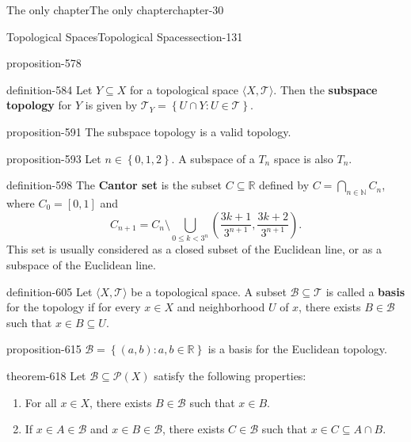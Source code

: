 \documentclass[oneside,10pt,]{book}
\newcommand{\terminology}[1]{\textbf{#1}}
\newcommand{\tuple}[1]{\langle #1 \rangle}
\newcommand{\mb}{\mathbb}
\newcommand{\mc}{\mathcal}
\newcommand{\setBuilder}[2]{\left\{#1:#2\right\}}
\newcommand{\setList}[1]{\left\{#1\right\}}
\newcommand{\lt}{<}
\begin{document}
\begin{chapterptx}{The only chapter}{}{The only chapter}{}{}{chapter-30}
\begin{sectionptx}{Topological Spaces}{}{Topological Spaces}{}{}{section-131}
\begin{proposition}{}{}{proposition-578}
\end{proposition}
\begin{definition}{}{definition-584}%
\hypertarget{p-585}{}%
Let \(Y\subseteq X\) for a topological space \(\tuple{X,\mc T}\). Then the \terminology{subspace topology} for \(Y\) is given by \(\mc T_Y=\setBuilder{U\cap Y}{U\in\mc T}\).%
\end{definition}
\begin{proposition}{}{}{proposition-591}%
\hypertarget{p-592}{}%
The subspace topology is a valid topology.%
\end{proposition}
\begin{proposition}{}{}{proposition-593}%
\hypertarget{p-594}{}%
Let \(n\in\setList{0,1,2}\). A subspace of a \(T_n\) space is also \(T_n\).%
\end{proposition}
\begin{definition}{}{definition-598}%
\hypertarget{p-599}{}%
The \terminology{Cantor set} is the subset \(C\subseteq\mb R\) defined by \(C=\bigcap_{n\in\mb N} C_n\), where \(C_0=[0,1]\) and%
\begin{equation*}
C_{n+1}=C_n\setminus\bigcup_{0\leq k\lt 3^n} 
\left(\frac{3k+1}{3^{n+1}},\frac{3k+2}{3^{n+1}}\right).
\end{equation*}
This set is usually considered as a closed subset of the Euclidean line, or as a subspace of the Euclidean line.%
\end{definition}
\begin{definition}{}{definition-605}%
\hypertarget{p-606}{}%
Let \(\tuple{X,\mc T}\) be a topological space. A subset \(\mc B\subseteq\mc T\) is called a \terminology{basis} for the topology if for every \(x\in X\) and neighborhood \(U\) of \(x\), there exists \(B\in\mc B\) such that \(x\in B\subseteq U\).%
\end{definition}
\begin{proposition}{}{}{proposition-615}%
\hypertarget{p-616}{}%
\(\mc B=\setBuilder{(a,b)}{a,b\in\mb R}\) is a basis for the Euclidean topology.%
\end{proposition}
\begin{theorem}{}{}{theorem-618}%
\hypertarget{p-619}{}%
Let \(\mc B\subseteq\mc P(X)\) satisfy the following properties:%
\leavevmode%
\begin{enumerate}
\item\hypertarget{li-622}{}For all \(x\in X\), there exists \(B\in\mc B\) such that \(x\in B\).%
\item\hypertarget{li-626}{}If \(x\in A\in\mc B\) and \(x\in B\in\mc B\), there exists \(C\in\mc B\) such that \(x\in C\subseteq A\cap B\).%

\end{enumerate}
\end{theorem}
\end{sectionptx}
\end{chapterptx}
\end{document}
